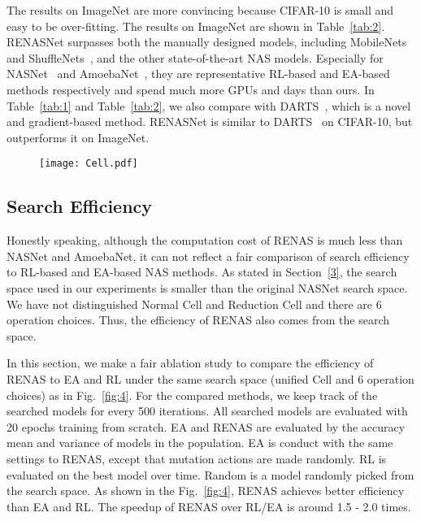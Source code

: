 \documentclass[10pt,twocolumn,letterpaper]{article}
\begin{document}
\noindent
The results on ImageNet are more convincing because CIFAR-10 is small and easy to be over-fitting.
The results on ImageNet are shown in Table~\ref{tab:2}. RENASNet surpasses both the manually designed models, including MobileNets~\cite{howard2017mobilenets,sandler2018inverted} and ShuffleNets~\cite{zhang2017shufflenet,DBLP:journals/corr/abs-1807-11164}, and the other state-of-the-art NAS models. Especially for NASNet~\cite{zoph2017learning} and AmoebaNet~\cite{Real2018Regularized}, they are representative RL-based and EA-based methods respectively and spend much more GPUs and days than ours.
In Table~\ref{tab:1} and Table~\ref{tab:2}, we also compare with DARTS~\cite{DBLP:journals/corr/abs-1806-09055}, which is a novel and gradient-based method. RENASNet is similar to DARTS~\cite{DBLP:journals/corr/abs-1806-09055} on CIFAR-10, but outperforms it on ImageNet.
		\begin{figure}[t]%
  \centering
  \texttt{[image: Cell.pdf]}%
  \label{fig:3}
 \end{figure}

\subsection{Search Efficiency}
\label{5.3}
Honestly speaking, although the computation cost of RENAS is much less than NASNet and AmoebaNet, it can not reflect a fair comparison of search efficiency to RL-based and EA-based NAS methods. As stated in Section~\ref{3}, the search space used in our experiments is smaller than the original NASNet search space. We have not distinguished Normal Cell and Reduction Cell and there are 6 operation choices. Thus, the efficiency of RENAS also comes from the search space.

In this section, we make a fair ablation study to compare the efficiency of RENAS to EA and RL under the same search space (unified Cell and 6 operation choices) as in Fig.~\ref{fig:4}. For the compared methods, we keep track of the searched models for every 500 iterations. All searched models are evaluated with 20 epochs training from scratch. EA and RENAS are evaluated by the accuracy mean and variance of models in the population. EA is conduct with the same settings to RENAS, except that mutation actions are made randomly. RL is evaluated on the best model over time. Random is a model randomly picked from the search space. As shown in the Fig.~\ref{fig:4}, RENAS achieves better efficiency than EA and RL. The speedup of RENAS over RL/EA is around 1.5 - 2.0 times.
\end{document}
